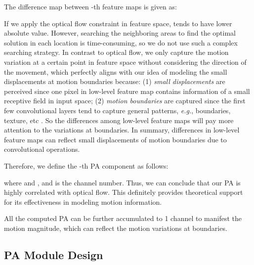 \documentclass[journal]{IEEEtran}
\begin{document}
The difference map  between -th feature maps is given as:



If we apply the optical flow constraint in feature space,  tends to have lower absolute value. However, searching the neighboring areas to find the optimal solution  in each location is time-consuming, so we do not use such a complex searching strategy. In contrast to optical flow, we only capture the motion variation at a certain point in feature space without considering the direction of the movement, which perfectly aligns with our idea of modeling the small displacements at motion boundaries because: (1) \emph{small displacements} are perceived since one pixel in low-level feature map contains information of a small receptive field in input space; (2) \emph{motion boundaries} are captured since the first few convolutional layers tend to capture general patterns, \emph{e.g.}, boundaries, texture, etc \cite{zeiler2014visualizing}. So the differences among low-level feature maps will pay more attention to the variations at boundaries. In summary, differences in low-level feature maps can reflect small displacements of motion boundaries due to convolutional operations.

Therefore, we define the -th PA component as follows:

where  and , and  is the channel number. Thus, we can conclude that our PA is highly correlated with optical flow. This definitely provides theoretical support for its effectiveness in modeling motion information.

All the computed PA can be further accumulated to 1 channel to manifest the motion magnitude, which can reflect the motion variations at boundaries.



\subsection{PA Module Design} \label{section:PA_module}
\end{document}
